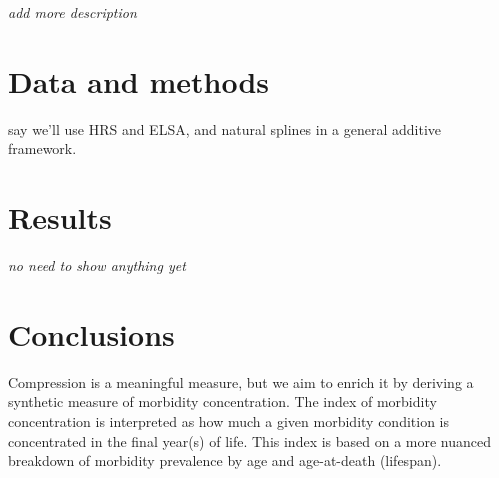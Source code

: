 \documentclass{article}
\begin{document}
\textit{add more description}

\section*{Data and methods}
say we'll use HRS and ELSA, and natural splines in a general additive framework.
\section*{Results}
\textit{no need to show anything yet}
\section*{Conclusions}
Compression is a meaningful measure, but we aim to enrich it by deriving a
synthetic measure of morbidity concentration. The index of morbidity
concentration is interpreted as how much a given morbidity condition is
concentrated in the final year(s) of life. This index is based on a more
nuanced breakdown of morbidity prevalence by age and age-at-death (lifespan). 


    
\end{document}
